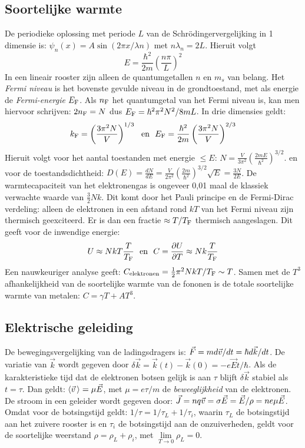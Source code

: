 \documentclass[twoside]{report}
\begin{document}
\subsection{Soortelijke warmte}
De periodieke oplossing met periode $L$ van de Schr\"odingervergelijking in
1 dimensie is:
$\psi_n(x)=A\sin(2\pi x/\lambda n)$ met $n\lambda_n=2L$. Hieruit volgt
\[
E=\frac{\hbar^2}{2m}\left(\frac{n\pi}{L}\right)^2
\]
In een lineair rooster zijn alleen de quantumgetallen $n$ en $m_s$ van
belang. Het {\em Fermi niveau} is het bovenste gevulde niveau in de
grondtoestand, met als energie de {\em Fermi-energie} $E_{\rm F}$. Als
$n_{\rm F}$ het quantumgetal van het Fermi niveau is, kan men hiervoor
schrijven: $2n_{\rm F}=N$ dus $E_{\rm F}=\hbar^2\pi^2 N^2/8mL$. In drie
dimensies geldt:
\[
k_{\rm F}=\left(\frac{3\pi^2N}{V}\right)^{1/3}~~\mbox{en}~~
E_{\rm F}=\frac{\hbar^2}{2m}\left(\frac{3\pi^2N}{V}\right)^{2/3}
\]
Hieruit volgt voor het aantal toestanden met energie $\leq E$:
$\displaystyle N=\frac{V}{3\pi^2}\left(\frac{2mE}{\hbar^2}\right)^{3/2}$.
\npar
en voor de toestandsdichtheid:
$\displaystyle D(E)=\frac{dN}{dE}=\frac{V}{2\pi^2}\left(\frac{2m}{\hbar^2}\right)^{3/2}
\sqrt{E}=\frac{3N}{2E}$.
\npar
De warmtecapaciteit van het elektronengas is ongeveer 0,01 maal de klassiek
verwachte waarde van $\frac{3}{2}Nk$. Dit komt door het Pauli principe en de
Fermi-Dirac verdeling: alleen de elektronen in een afstand rond $kT$ van het
Fermi niveau zijn thermisch geexciteerd. Er is dan een fractie
$\approx T/T_{\rm F}$ thermisch aangeslagen. Dit geeft voor de inwendige energie:
\[
U\approx NkT\frac{T}{T_{\rm F}}~~\mbox{en}~~C=\frac{\partial U}{\partial T}\approx Nk\frac{T}{T_{\rm F}}
\]
Een nauwkeuriger analyse geeft:
$C_{\rm elektronen}=\frac{1}{2}\pi^2NkT/T_{\rm F}\sim T$. Samen met de $T^3$
afhankelijkheid van de soortelijke warmte van de fononen is de totale
soortelijke warmte van metalen: $C=\gamma T+AT^3$.

\subsection{Elektrische geleiding}
De bewegingsvergelijking van de ladingsdragers is:
$\vec{F}=md\vec{v}/dt=\hbar d\vec{k}/dt$. De variatie van $\vec{k}$ wordt gegeven
door $\delta\vec{k}=\vec{k}(t)-\vec{k}(0)=-e\vec{E}t/\hbar$. Als de
karakteristieke tijd dat de elektronen botsen gelijk is aan $\tau$ blijft
$\delta\vec{k}$ stabiel als $t=\tau$. Dan geldt: $\left\langle \vec{v}\, \right\rangle=\mu\vec{E}$,
met $\mu=e\tau/m$ de {\it beweeglijkheid} van de elektronen.
\npar
De stroom in een geleider wordt gegeven door:
$\vec{J}=nq\vec{v}=\sigma\vec{E}=\vec{E}/\rho=ne\mu\vec{E}$. Omdat voor de
botsingstijd geldt: $1/\tau=1/\tau_L+1/\tau_i$, waarin $\tau_L$ de
botsingstijd aan het zuivere rooster is en $\tau_i$ de botsingstijd aan de
onzuiverheden, geldt voor de soortelijke weerstand $\rho=\rho_L+\rho_i$, met
$\lim\limits_{T\rightarrow 0}\rho_L=0$.
\end{document}
